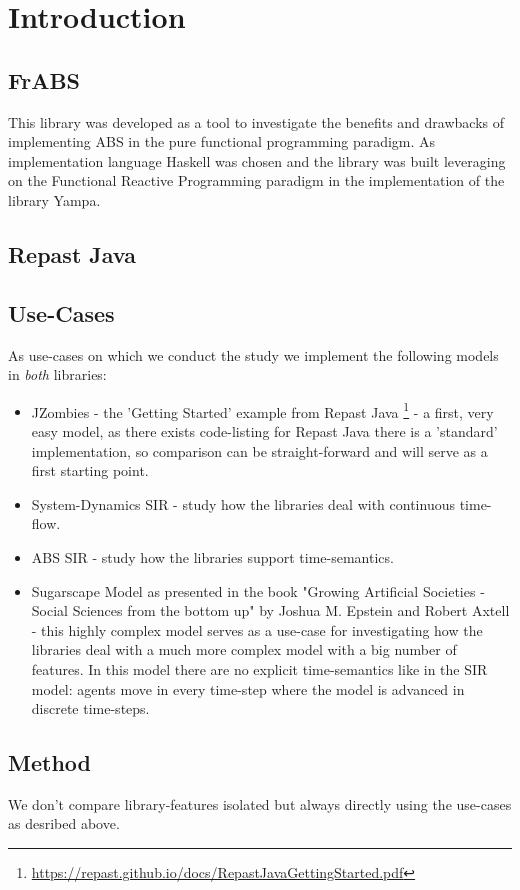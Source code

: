 \section{Introduction}

\subsection{FrABS}
This library was developed as a tool to investigate the benefits and drawbacks of implementing ABS in the pure functional programming paradigm. As implementation language Haskell was chosen and the library was built leveraging on the Functional Reactive Programming paradigm in the implementation of the library Yampa.

\subsection{Repast Java}


\subsection{Use-Cases}
As use-cases on which we conduct the study we implement the following models in \textit{both} libraries:

\begin{itemize}
	\item JZombies - the 'Getting Started' example from Repast Java \footnote{\url{https://repast.github.io/docs/RepastJavaGettingStarted.pdf}} - a first, very easy model, as there exists code-listing for Repast Java there is a 'standard' implementation, so comparison can be straight-forward and will serve as a first starting point.
	
	\item System-Dynamics SIR - study how the libraries deal with continuous time-flow.
	
	\item ABS SIR - study how the libraries support time-semantics.
	
	\item Sugarscape Model as presented in the book "Growing Artificial Societies - Social Sciences from the bottom up" by Joshua M. Epstein and Robert Axtell \cite{epstein_growing_1996} - this highly complex model serves as a use-case for investigating how the libraries deal with a much more complex model with a big number of features. In this model there are no explicit time-semantics like in the SIR model: agents move in every time-step where the model is advanced in discrete time-steps.
\end{itemize}

\subsection{Method}
We don't compare library-features isolated but always directly using the use-cases as desribed above.
